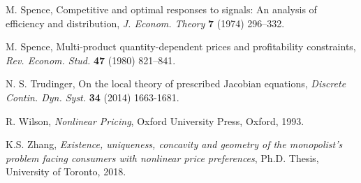 \documentclass[a4paper, 11pt]{amsart}
\numberwithin{equation}{section}
\theoremstyle{plain}
\theoremstyle{definition}
\theoremstyle{remark}
\begin{document}
\begin{thebibliography}{BCDE}
	M. Spence, 
	Competitive and optimal responses to signals: An analysis of efficiency and distribution, 
	{\em J. Econom. Theory} {\bf 7} (1974) 296–332.

	M. Spence, 
	Multi-product quantity-dependent prices and profitability constraints, 
	{\em Rev. Econom. Stud.} {\bf 47} (1980) 821–841.
	
	N. S. Trudinger, 
	On the local theory of prescribed Jacobian equations, 
	{\em Discrete Contin. Dyn. Syst.} {\bf 34} (2014) 1663-1681.



	R. Wilson, 
	{\em Nonlinear Pricing}, 
	Oxford University Press, Oxford, 1993.

	K.S. Zhang,
	{\em Existence, uniqueness, concavity and geometry of the monopolist’s
	problem facing consumers with nonlinear price preferences}, Ph.D. Thesis, University of Toronto, 2018.
	
	
\end{thebibliography}


\bigskip
\end{document}
